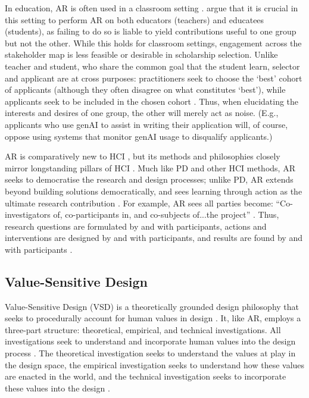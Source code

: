 In education, AR is often used in a classroom setting \cite{Mertler_2019}. \textcite{venn-wycherley_realities_2024} argue that it is crucial in this setting to perform AR on both educators (teachers) and educatees (students), as failing to do so is liable to yield contributions useful to one group but not the other. While this holds for classroom settings, engagement across the stakeholder map is less feasible or desirable in scholarship selection. Unlike teacher and student, who share the common goal that the student learn, selector and applicant are at cross purposes: practitioners seek to choose the `best' cohort of applicants (although they often disagree on what constitutes `best'), while applicants seek to be included in the chosen cohort \cite{bergman2021seven}. Thus, when elucidating the interests and desires of one group, the other will merely act as noise. (E.g., applicants who use genAI to assist in writing their application will, of course, oppose using systems that monitor genAI usage to disqualify applicants.)

AR is comparatively new to HCI \cite{Hayes_2011,lu_organizing_2023}, but its methods and philosophies closely mirror longstanding pillars of HCI \cite{Hayes_2011}. Much like PD and other HCI methods, AR seeks to democratise the research and design processes; unlike PD, AR extends beyond building solutions democratically, and sees learning through action as the ultimate research contribution \cite{Hayes_2011}. For example, AR sees all parties become: ``Co-investigators of, co-participants in, and co-subjects of...the project'' \cite{Hayes_2011}.  Thus, research questions are formulated by and with participants, actions and interventions are designed by and with participants, and results are found by and with participants \cite{Hayes_2011}.

\subsection{Value-Sensitive Design}\label{ssec:value_sensitive_design}
Value-Sensitive Design (VSD) is a theoretically grounded design philosophy that seeks to procedurally account for human values in design \cite{batyavalue}. It, like AR, employs a three-part structure: theoretical, empirical, and technical investigations. All investigations seek to understand and incorporate human values into the design process \cite{10.1145/242485.242493}. The theoretical investigation seeks to understand the values at play in the design space, the empirical investigation seeks to understand how these values are enacted in the world, and the technical investigation seeks to incorporate these values into the design \cite{10.1145/242485.242493}.

